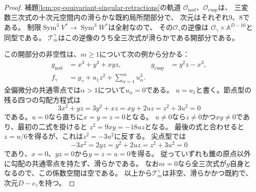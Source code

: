 \begin{proof}
補題\ref{lem:pg-equivariant-singular-retractions}の軌道
$\mathcal O_{\mathrm{nod}}$、$\mathcal O_{\mathrm{cusp}}$は、
三変数三次式の十次元空間内の滑らかな既約局所閉部分で、
次元はそれぞれ$9$、$8$である。
制限$\operatorname{Sym}^3V^*\to\operatorname{Sym}^3W^*$は全射なので、
その$\mathcal O_\gamma$の逆像は
$\mathcal O_\gamma\times\mathbb A^{D-10}$と同型である。
$\mathcal T_m^\gamma$はこの逆像のうち全三次式が滑らかである開部分である。

この開部分の非空性は、$m\ge1$について次の例から分かる：
\begin{equation}
 \begin{aligned}
  g_{\mathrm{nod}}&=x^3+y^3+xyz,&
  g_{\mathrm{cusp}}&=y^2z-x^3,\\
  f_\gamma&=g_\gamma+u_1z^2+\sum_{\alpha=1}^m u_\alpha^3.
 \end{aligned}
 \label{eq:pg-equivariant-singular-smooth-examples}
\end{equation}
全偏微分の共通零点では$\alpha>1$について$u_\alpha=0$である。
$u=u_1$と書く。節点型の残る四つの勾配方程式は
\begin{equation}
 3x^2+yz=3y^2+xz=xy+2uz=z^2+3u^2=0
 \label{eq:pg-equivariant-nodal-example-gradient}
\end{equation}
である。$u=0$なら直ちに$x=y=z=0$となる。
$u\ne0$なら$z\ne0$かつ$xy\ne0$であり、最初の二式を掛けると
$z^2=9xy=-18uz$となる。
最後の式と合わせると$z=u/6$を得るが、これは$z^2=-3u^2$に反する。
尖点型では
\begin{equation}
 -3x^2=2yz=y^2+2uz=z^2+3u^2=0
 \label{eq:pg-equivariant-cuspidal-example-gradient}
\end{equation}
であり、$x=0$、$yz=0$から$y=z=u=0$を得る。
従っていずれも錐の原点以外に勾配の共通零点を持たず、滑らかである。
なお$m=0$なら全三次式が$g$自身となるので、この係数空間は空である。
以上から$\mathcal T_m^\gamma$は非空、滑らかかつ既約で、次元$D-c_\gamma$を持つ。


\end{proof}
